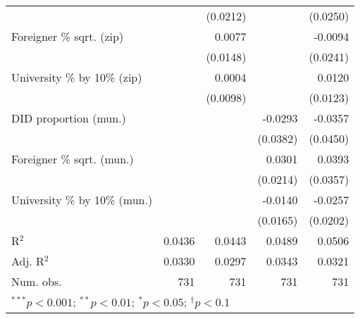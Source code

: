 \begin{tabular}{l D{.}{.}{3.7} D{.}{.}{3.7} D{.}{.}{3.7} D{.}{.}{3.7}}
                                  &               & (0.0212)      &               & (0.0250)      \\
Foreigner \% sqrt. (zip)          &               & 0.0077        &               & -0.0094       \\
                                  &               & (0.0148)      &               & (0.0241)      \\
University \% by 10\% (zip)       &               & 0.0004        &               & 0.0120        \\
                                  &               & (0.0098)      &               & (0.0123)      \\
DID proportion (mun.)             &               &               & -0.0293       & -0.0357       \\
                                  &               &               & (0.0382)      & (0.0450)      \\
Foreigner \% sqrt. (mun.)         &               &               & 0.0301        & 0.0393        \\
                                  &               &               & (0.0214)      & (0.0357)      \\
University \% by 10\% (mun.)      &               &               & -0.0140       & -0.0257       \\
                                  &               &               & (0.0165)      & (0.0202)      \\
\midrule
R$^2$                             & 0.0436        & 0.0443        & 0.0489        & 0.0506        \\
Adj. R$^2$                        & 0.0330        & 0.0297        & 0.0343        & 0.0321        \\
Num. obs.                         & 731           & 731           & 731           & 731           \\
\bottomrule
{}
\end{tabular}
